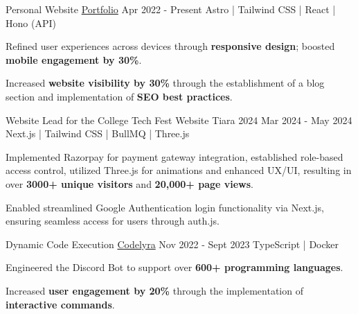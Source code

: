 \begin{cventries}
  \cventry
  {Personal Website} %
  {\href{https://github.com/anishshobithps/anishshobithps.com}{Portfolio}} %
  {Apr 2022 - Present} %
  {Astro | Tailwind CSS | React | Hono (API)} %
  {
    \begin{cvitems}
     \item {Refined user experiences across devices through {\bf responsive design}; boosted {\bf mobile engagement by 30\%}.}
\item {Increased {\bf website visibility by 30\%} through the establishment of a blog section and implementation of {\bf SEO best practices}.}
    \end{cvitems}
  }


  \cventry
  {Website Lead for the College Tech Fest Website} %
  {Tiara 2024} %
  {Mar 2024 - May 2024} %
  {Next.js | Tailwind CSS | BullMQ | Three.js} %
  {
    \begin{cvitems} %
\item {Implemented Razorpay for payment gateway integration, established role-based access control, utilized Three.js for animations and enhanced UX/UI, resulting in over {\bf 3000+ unique visitors} and {\bf 20,000+ page views}.}
      \item {Enabled streamlined Google Authentication login functionality via Next.js, ensuring seamless access for users through auth.js.}
    \end{cvitems}
  }

  \cventry
  {Dynamic Code Execution} %
  {\href{https://github.com/anishshobithps/codelyra}{Codelyra}} %
  {Nov 2022 - Sept 2023} %
  {TypeScript | Docker} %
  {
    \begin{cvitems} %
      \item {Engineered the Discord Bot to support over {\bf 600+ programming languages}.}
      \item{Increased {\bf user engagement by 20\%} through the implementation of {\bf interactive commands}.}
    \end{cvitems}
  }
\end{cventries}
